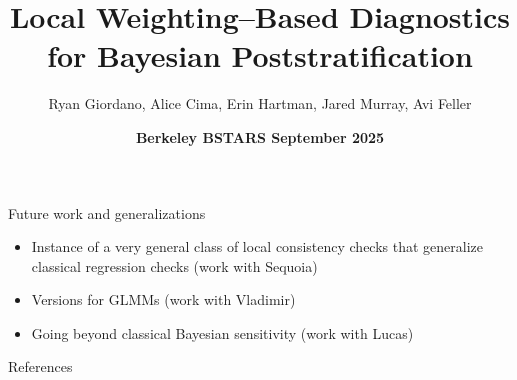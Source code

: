 \documentclass[8pt]{beamer}\usepackage[]{graphicx}\usepackage[]{color}
\title{Local Weighting--Based Diagnostics for Bayesian Poststratification}
\author{Ryan Giordano, Alice Cima, Erin Hartman, Jared Murray, Avi Feller}
\date{\textbf{Berkeley BSTARS September 2025}}
\begin{document}
\maketitle














\begin{frame}{Future work and generalizations}
%
\begin{itemize}
    \item Instance of a very general class of local consistency checks that generalize
          classical regression checks (work with Sequoia)
    \item Versions for GLMMs (work with Vladimir)
    \item Going beyond classical Bayesian sensitivity (work with Lucas)
\end{itemize}
%
\end{frame}




\begin{frame}{References}

\footnotesize


\begingroup
\renewcommand{\section}[2]{}%

\endgroup

\end{frame}
\end{document}
